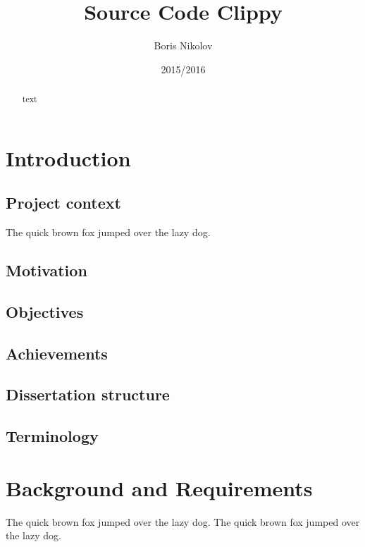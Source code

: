 \documentclass{l4proj}
\begin{document}
\title{Source Code Clippy}
\author{Boris Nikolov}
\date{2015/2016}
\maketitle

\begin{abstract}
text
\end{abstract}

\educationalconsent
%
%
\tableofcontents

\chapter{Introduction}

\section{Project context}
The quick brown fox jumped over the lazy dog.


\section{Motivation}

\section{Objectives}

\section{Achievements}

\section{Dissertation structure}

\section{Terminology}

\chapter{Background and Requirements}
The quick brown fox jumped over the lazy dog.
The quick brown fox jumped over the lazy dog.
\end{document}
